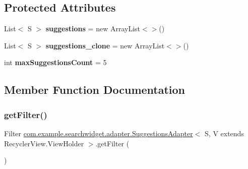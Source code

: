\subsection*{Protected Attributes}
\begin{DoxyCompactItemize}
\item 
\mbox{\label{classcom_1_1example_1_1searchwidget_1_1adapter_1_1_suggestions_adapter_a0b2422548b88b244f502146a92b85956}} 
List$<$ S $>$ {\bfseries suggestions} = new Array\+List$<$$>$()
\item 
\mbox{\label{classcom_1_1example_1_1searchwidget_1_1adapter_1_1_suggestions_adapter_a21779cad1870be8e5a97a23720a7d336}} 
List$<$ S $>$ {\bfseries suggestions\+\_\+clone} = new Array\+List$<$$>$()
\item 
\mbox{\label{classcom_1_1example_1_1searchwidget_1_1adapter_1_1_suggestions_adapter_af6a720e4b7c613d7f4c86a0dc2b3d95f}} 
int {\bfseries max\+Suggestions\+Count} = 5
\end{DoxyCompactItemize}


\subsection{Member Function Documentation}
\mbox{\label{classcom_1_1example_1_1searchwidget_1_1adapter_1_1_suggestions_adapter_ac5668046367eab0b8c0dbffaf378e0b9}} 
\subsubsection{\texorpdfstring{getFilter()}{getFilter()}}
{\footnotesize\ttfamily Filter \mbox{\hyperlink{classcom_1_1example_1_1searchwidget_1_1adapter_1_1_suggestions_adapter}{com.\+example.\+searchwidget.\+adapter.\+Suggestions\+Adapter}}$<$ S, V extends Recycler\+View.\+View\+Holder $>$.get\+Filter (\begin{DoxyParamCaption}{ }\end{DoxyParamCaption})}


